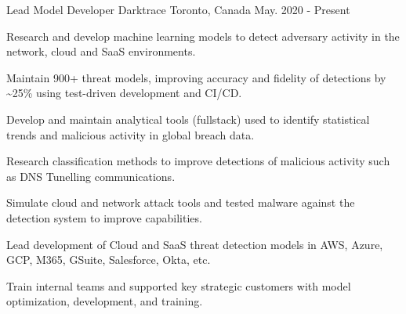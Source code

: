 

\begin{cventries}

  \cventry
    {Lead Model Developer} %
    {Darktrace} %
    {Toronto, Canada} %
    {May. 2020 - Present} %
    {
      \begin{cvitems} %
        \item {Research and develop machine learning models to detect adversary activity in the network, cloud and SaaS environments.}
        \item {Maintain 900+ threat models, improving accuracy and fidelity of detections by \~{}25\% using test-driven development and CI/CD.}
        \item {Develop and maintain analytical tools (fullstack) used to identify statistical trends and malicious activity in global breach data.}
        \item {Research classification methods to improve detections of malicious activity such as DNS Tunelling communications.}
        \item {Simulate cloud and network attack tools and tested malware against the detection system to improve capabilities.}
        \item {Lead development of Cloud and SaaS threat detection models in AWS, Azure, GCP, M365, GSuite, Salesforce, Okta, etc.}
        \item {Train internal teams and supported key strategic customers with model optimization, development, and training.}
      \end{cvitems}
    }


\end{cventries}
